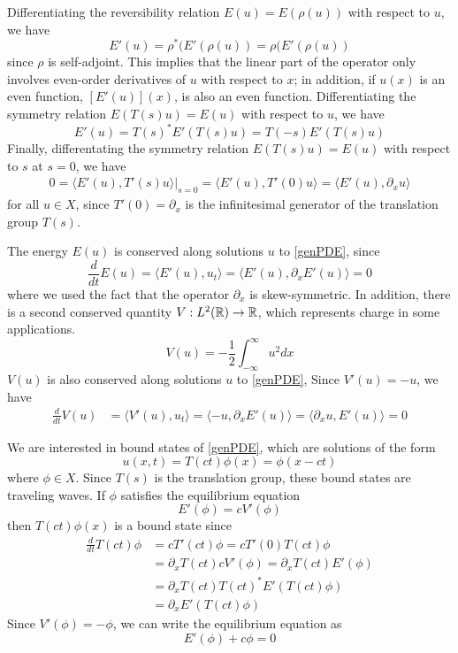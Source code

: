 \documentclass[thesis.tex]{subfiles}
\begin{document}
Differentiating the reversibility relation $E(u) = E(\rho(u))$ with respect to $u$, we have
\[
E'(u) = \rho^*( E'(\rho(u) ) = \rho( E'(\rho(u) )
\]
since $\rho$ is self-adjoint. This implies that the linear part of the operator only involves even-order derivatives of $u$ with respect to $x$; in addition, if $u(x)$ is an even function, $[E'(u)](x)$, is also an even function. Differentiating the symmetry relation $E(T(s)u) = E(u)$ with respect to $u$, we have
\begin{equation}\label{Eprimesymm}
E'(u) = T(s)^* E'(T(s)u) = T(-s) E'(T(s)u)
\end{equation}
Finally, differentating the symmetry relation $E(T(s)u) = E(u)$ with respect to $s$ at $s = 0$, we have
\begin{align*}
0 = \langle E'(u), T'(s) u \rangle|_{s = 0}
= \langle E'(u), T'(0) u \rangle
= \langle E'(u), \partial_x u \rangle
\end{align*}
for all $u \in X$, since $T'(0) = \partial_x$ is the infinitesimal generator of the translation group $T(s)$.

The energy $E(u)$ is conserved along solutions $u$ to \eqref{genPDE}, since
\[
\frac{d}{dt}E(u) = \langle E'(u), u_t \rangle = \langle E'(u), \partial_x E'(u) \rangle = 0
\]
where we used the fact that the operator $\partial_x$ is skew-symmetric. In addition, there is a second conserved quantity $V: L^2({\mathbb R}) \rightarrow {\mathbb R}$, which represents charge in some applications.
\begin{equation}\label{defV}
V(u) = -\frac{1}{2} \int_{-\infty}^\infty u^2 dx 
\end{equation}
$V(u)$ is also conserved along solutions $u$ to \eqref{genPDE}, Since $V'(u) = -u$, we have
\begin{align*}
\frac{d}{dt}V(u) &= \langle V'(u), u_t \rangle
= \langle -u, \partial_x E'(u) \rangle 
= \langle \partial_x u, E'(u) \rangle = 0
\end{align*}

We are interested in bound states of \eqref{genPDE}, which are solutions of the form
\begin{equation}
u(x, t) = T(ct)\phi(x) = \phi(x - ct)
\end{equation}
where $\phi \in X$. Since $T(s)$ is the translation group, these bound states are traveling waves. If $\phi$ satisfies the equilibrium equation
\begin{equation}\label{eqODE1}
E'(\phi) = c V'(\phi)
\end{equation}
then $T(ct)\phi(x)$ is a bound state since 
\begin{align*}
\frac{d}{dt}T(ct)\phi &= c T'(ct)\phi 
= c T'(0)T(ct)\phi \\
&= \partial_x T(ct) c V'(\phi)
= \partial_x T(ct) E'(\phi) \\
&= \partial_x T(ct) T(ct)^* E'(T(ct)\phi) \\
&= \partial_x E'(T(ct)\phi) 
\end{align*}
Since $V'(\phi) = -\phi$, we can write the equilibrium equation as
\begin{equation}\label{eqODE}
E'(\phi) + c \phi = 0 
\end{equation}
\end{document}
